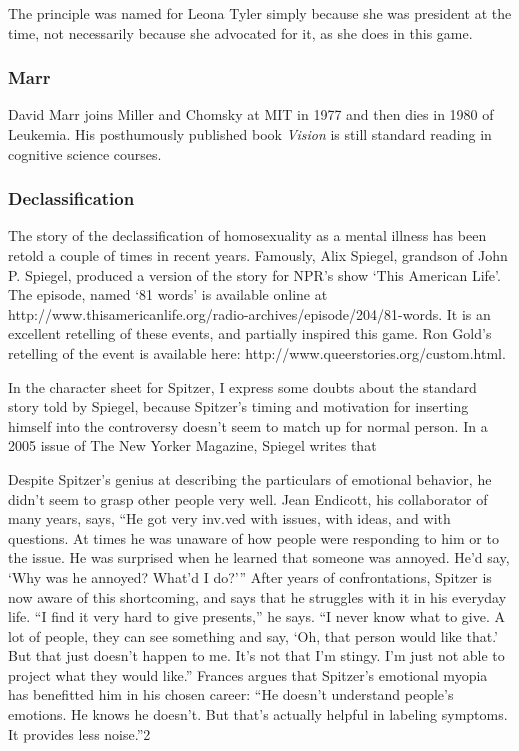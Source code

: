 The principle was named for Leona Tyler simply because she was president at the time, not necessarily because she advocated for it, as she does in this game. 

\subsubsection{Marr}
\label{marr}

David Marr joins Miller and Chomsky at MIT in 1977 and then dies in 1980 of Leukemia. His posthumously published book \emph{Vision} is still standard reading in cognitive science courses.

\subsubsection{Declassification}
\label{declassification}

The story of the declassification of homosexuality as a mental illness has been retold a couple of times in recent years. Famously, Alix Spiegel, grandson of John P. Spiegel, produced a version of the story for NPR's show `This American Life'. The episode, named `81 words' is available online at http:\slash \slash www.thisamericanlife.org\slash radio-archives\slash episode\slash 204\slash 81-words. It is an excellent retelling of these events, and partially inspired this game. Ron Gold's retelling of the event is available here: http:\slash \slash www.queerstories.org\slash custom.html.

In the character sheet for Spitzer, I express some doubts about the standard story told by Spiegel, because Spitzer's timing and motivation for inserting himself into the controversy doesn't seem to match up for normal person. In a 2005 issue of The New Yorker Magazine, Spiegel writes that 

Despite Spitzer’s genius at describing the particulars of emotional behavior, he didn’t seem to grasp other people very well. Jean Endicott, his collaborator of many years, says, “He got very inv.ved with issues, with ideas, and with questions. At times he was unaware of how people were responding to him or to the issue. He was surprised when he learned that someone was annoyed. He’d say, ‘Why was he annoyed? What’d I do?’” After years of confrontations, Spitzer is now aware of this shortcoming, and says that he struggles with it in his everyday life. “I find it very hard to give presents,” he says. “I never know what to give. A lot of people, they can see something and say, ‘Oh, that person would like that.’ But that just doesn’t happen to me. It’s not that I’m stingy. I’m just not able to project what they would like.” Frances argues that Spitzer’s emotional myopia has benefitted him in his chosen career: “He doesn’t understand people’s emotions. He knows he doesn’t. But that’s actually helpful in labeling symptoms. It provides less noise.”2

